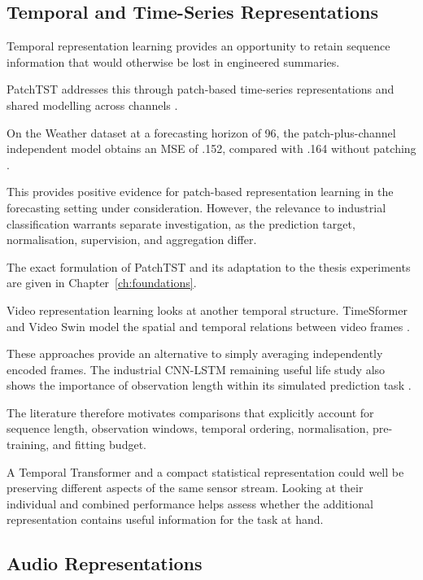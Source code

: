 \subsection{Temporal and Time-Series Representations}

Temporal representation learning provides an opportunity to retain sequence information that would
otherwise be lost in engineered summaries.

PatchTST addresses this through patch-based time-series representations and shared modelling across
channels \citep[Sections~3.1--3.2]{Nie2023PatchTST}.

On the Weather dataset at a forecasting horizon of 96, the patch-plus-channel independent model
obtains an MSE of .152, compared with .164 without patching \citep[Table~7]{Nie2023PatchTST}.

This provides positive evidence for patch-based representation learning in the forecasting setting
under consideration. However, the relevance to industrial classification warrants separate
investigation, as the prediction target, normalisation, supervision, and aggregation differ.

The exact formulation of PatchTST and its adaptation to the thesis experiments are given in
Chapter~\ref{ch:foundations}.

Video representation learning looks at another temporal structure. TimeSformer and Video Swin model
the spatial and temporal relations between video frames \citep{P034,P013}.

These approaches provide an alternative to simply averaging independently encoded frames. The
industrial CNN-LSTM remaining useful life study also shows the importance of observation length
within its simulated prediction task \citep{AlDulaimi2019A}.

The literature therefore motivates comparisons that explicitly account for sequence length,
observation windows, temporal ordering, normalisation, pre-training, and fitting budget.

A Temporal Transformer and a compact statistical representation could well be preserving different
aspects of the same sensor stream. Looking at their individual and combined performance helps assess
whether the additional representation contains useful information for the task at hand.

\subsection{Audio Representations}

